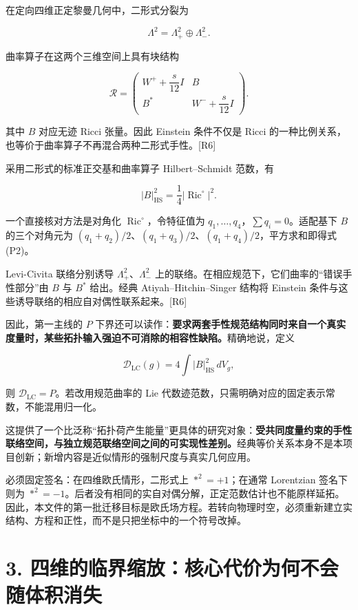 \documentclass[UTF8,a4paper,11pt,fontset=fandol]{ctexart}
\begin{document}
在定向四维正定黎曼几何中，二形式分裂为

\[
\Lambda^2=\Lambda^2_+\oplus\Lambda^2_-.
\]

曲率算子在这两个三维空间上具有块结构

\[
\mathcal R=
\begin{pmatrix}
W^++\dfrac{s}{12}I&B\\
B^*&W^-+\dfrac{s}{12}I
\end{pmatrix}.
\tag{P1}
\]

其中 \(B\) 对应无迹 Ricci 张量。因此 Einstein 条件不仅是 Ricci
的一种比例关系，也等价于曲率算子不再混合两种二形式手性。{[}R6{]}

采用二形式的标准正交基和曲率算子 Hilbert--Schmidt 范数，有

\[
\boxed{|B|_{\mathrm{HS}}^2=\frac14|\operatorname{Ric}^{\circ}|^2.}
\tag{P2}
\]

一个直接核对方法是对角化 \(\operatorname{Ric}^{\circ}\)，令特征值为
\(q_1,\ldots,q_4\)，\(\sum q_i=0\)。适配基下 \(B\) 的三个对角元为
\((q_1+q_2)/2\)、\((q_1+q_3)/2\)、\((q_1+q_4)/2\)，平方求和即得式(P2)。

Levi-Civita 联络分别诱导 \(\Lambda^2_+\)、\(\Lambda^2_-\)
上的联络。在相应规范下，它们曲率的``错误手性部分''由 \(B\) 与 \(B^*\)
给出。经典 Atiyah--Hitchin--Singer 结构将 Einstein
条件与这些诱导联络的相应自对偶性联系起来。{[}R6{]}

因此，第一主线的 \(P\)
下界还可以读作：\textbf{要求两套手性规范结构同时来自一个真实度量时，某些拓扑输入强迫不可消除的相容性缺陷。}精确地说，定义

\[
\mathscr D_{\mathrm{LC}}(g)=4\int|B|_{\mathrm{HS}}^2\,dV_g,
\]

则 \(\mathscr D_{\mathrm{LC}}=P\)。若改用规范曲率的 Lie
代数迹范数，只需明确对应的固定表示常数，不能混用归一化。

这提供了一个比泛称``拓扑荷产生能量''更具体的研究对象：\textbf{受共同度量约束的手性联络空间，与独立规范联络空间之间的可实现性差别。}经典等价关系本身不是本项目创新；新增内容是近似情形的强制尺度与真实几何应用。

必须固定签名：在四维欧氏情形，二形式上 \(*^2=+1\)；在通常 Lorentzian
签名下则为
\(*^2=-1\)。后者没有相同的实自对偶分解，正定范数估计也不能原样延拓。因此，本文件的第一批迁移目标是欧氏场方程。若转向物理时空，必须重新建立实结构、方程和正性，而不是只把坐标中的一个符号改掉。

\section{3.
四维的临界缩放：核心代价为何不会随体积消失}\label{ux56dbux7ef4ux7684ux4e34ux754cux7f29ux653eux6838ux5fc3ux4ee3ux4ef7ux4e3aux4f55ux4e0dux4f1aux968fux4f53ux79efux6d88ux5931}
\end{document}
